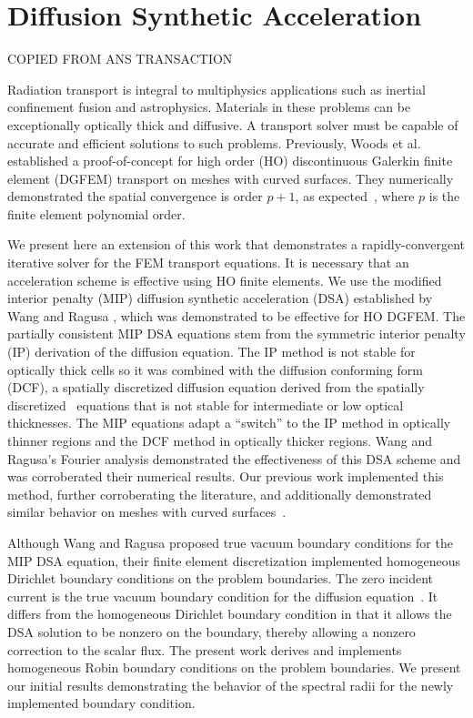 \documentclass[12pt]{article}
\begin{document}
\setlength{\abovedisplayskip}{5pt}
\setlength{\belowdisplayskip}{5pt}

\section{Diffusion Synthetic Acceleration}
\label{sec:DSA}
{\color{red}COPIED FROM ANS TRANSACTION}
{\color{blue}
Radiation transport is integral to multiphysics applications such as inertial confinement fusion and astrophysics. Materials in these problems can be exceptionally optically thick and diffusive. A transport solver must be capable of accurate and efficient solutions to such problems. Previously, Woods et al. \cite{WoodsHoDgfemXyCurved} established a proof-of-concept for high order (HO) discontinuous Galerkin finite element (DGFEM) transport on meshes with curved surfaces. They numerically demonstrated the spatial convergence is order $p+1$, as expected~\cite{LasaintFEM}, where $p$ is the finite element polynomial order.

We present here an extension of this work that demonstrates a rapidly-convergent iterative solver for the FEM transport equations. It is necessary that an acceleration scheme is effective using HO finite elements. We use the modified interior penalty (MIP) diffusion synthetic acceleration (DSA) established by Wang and Ragusa \cite{WangRagusaDSA}, which was demonstrated to be effective for HO DGFEM. The partially consistent MIP DSA equations stem from the symmetric interior penalty (IP) derivation of the diffusion equation. The IP method is not stable for optically thick cells so it was combined with the diffusion conforming form (DCF), a spatially discretized diffusion equation derived from the spatially discretized \SN\ equations that is not stable for intermediate or low optical thicknesses. The MIP equations adapt a ``switch'' to the IP method in optically thinner regions and the DCF method in optically thicker regions. Wang and Ragusa's Fourier analysis demonstrated the effectiveness of this DSA scheme and was corroberated their numerical results. Our previous work implemented this method, further corroberating the literature, and additionally demonstrated similar behavior on meshes with curved surfaces~\cite{WoodsDSA}.

Although Wang and Ragusa proposed true vacuum boundary conditions for the MIP DSA equation, their finite element discretization implemented homogeneous Dirichlet boundary conditions on the problem boundaries. The zero incident current is the true vacuum boundary condition for the diffusion equation~\cite{AdamsDSADFEM}. It differs from the homogeneous Dirichlet boundary condition in that it allows the DSA solution to be nonzero on the boundary, thereby allowing a nonzero correction to the scalar flux. The present work derives and implements homogeneous Robin boundary conditions on the problem boundaries. We present our initial results demonstrating the behavior of the spectral radii for the newly implemented boundary condition.

}
\end{document}
